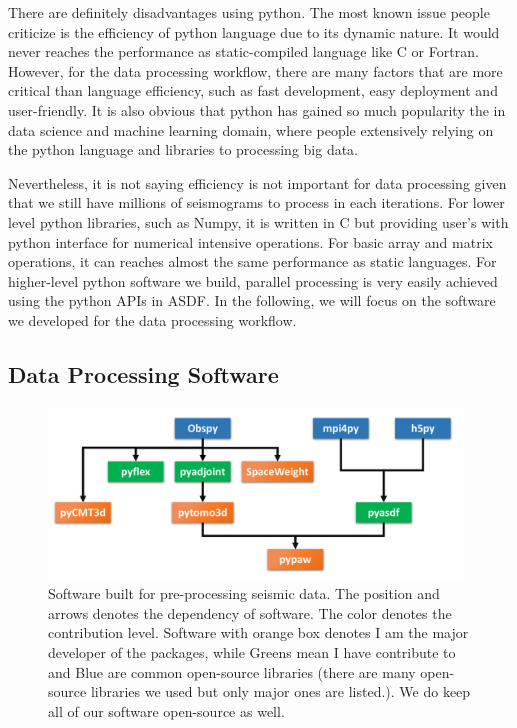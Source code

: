 There are definitely disadvantages using python. The most known issue people criticize is the
efficiency of python language due to its dynamic nature.
It would never reaches the performance
as static-compiled language like C or Fortran. However, for the data processing workflow,
there are many factors that are more critical than language efficiency, such as fast
development, easy deployment and user-friendly. It is also obvious that python
has gained so much popularity the in data science and machine learning domain, where
people extensively relying on the python language and libraries to processing big data.

Nevertheless, it is not saying efficiency is not important for data processing
given that we still have millions of seismograms to process in each iterations.
For lower level python libraries, such as Numpy, it is written in C but
providing user's with python interface for numerical intensive operations.
For basic array and matrix operations, it can reaches
almost the same performance as static languages. For higher-level python software
we build, parallel processing is very easily achieved using the python APIs in ASDF.
In the following, we will focus on the software we developed
 for the data processing workflow.

\subsection{Data Processing Software}

\begin{figure}
  \centering
  \includegraphics[width=0.98\textwidth]{ch-tools/figures/data_processing_software.pdf}
  \caption[software built for pre-processing seismic data]
  {\small{Software built for pre-processing seismic data. The position and arrows denotes
  the dependency of software. The color denotes the contribution level. Software with
  orange box denotes I am the major developer of the packages, while Greens mean I have
  contribute to and Blue are common open-source libraries (there are many open-source
  libraries we used but only major ones are listed.). We do keep all of our software
  open-source as well.}}
  \label{fig:preprocess_software}
\end{figure}


